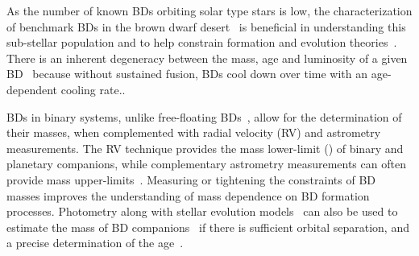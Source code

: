 As the number of known BDs orbiting solar type stars is low, the characterization of benchmark BDs in the brown dwarf desert~\citep[e.g.][]{crepp_trends_2016} is beneficial in understanding this sub-stellar population and to help constrain formation and evolution theories~\citep{whitworth_formation_2007}.
There is an inherent degeneracy between the mass, age and luminosity of a given BD~\citep{burrows_nongray_1997} because without sustained fusion, BDs cool down over time with an age-dependent cooling rate..

BDs in binary systems, unlike free-floating BDs~\citep[e.g][]{gagne_simp_2017}, allow for the determination of their masses, when complemented with radial velocity ({RV}) and astrometry measurements.
The {RV} technique provides the mass lower-limit (\Mtwosini{}) of binary and planetary companions, while complementary astrometry measurements can often provide mass upper-limits~\citep[e.g.][]{sahlmann_search_2011}.
Measuring or tightening the constraints of BD masses improves the understanding of mass dependence on BD formation processes.
Photometry along with stellar evolution models~\citep[e.g.][]{baraffe_evolutionary_2003,allard_btsettl_2013} can also be used to estimate the mass of BD companions~\citep[e.g.][]{moutou_eccentricity_2017} if there is sufficient orbital separation, and a precise determination of the age~\citep{soderblom_ages_2010}.




%
%
%
%
%
%
